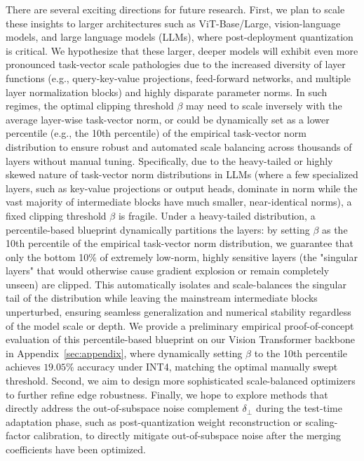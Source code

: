There are several exciting directions for future research. First, we plan to scale these insights to larger architectures such as ViT-Base/Large, vision-language models, and large language models (LLMs), where post-deployment quantization is critical. We hypothesize that these larger, deeper models will exhibit even more pronounced task-vector scale pathologies due to the increased diversity of layer functions (e.g., query-key-value projections, feed-forward networks, and multiple layer normalization blocks) and highly disparate parameter norms. In such regimes, the optimal clipping threshold $\beta$ may need to scale inversely with the average layer-wise task-vector norm, or could be dynamically set as a lower percentile (e.g., the 10th percentile) of the empirical task-vector norm distribution to ensure robust and automated scale balancing across thousands of layers without manual tuning. Specifically, due to the heavy-tailed or highly skewed nature of task-vector norm distributions in LLMs (where a few specialized layers, such as key-value projections or output heads, dominate in norm while the vast majority of intermediate blocks have much smaller, near-identical norms), a fixed clipping threshold $\beta$ is fragile. Under a heavy-tailed distribution, a percentile-based blueprint dynamically partitions the layers: by setting $\beta$ as the 10th percentile of the empirical task-vector norm distribution, we guarantee that only the bottom 10\% of extremely low-norm, highly sensitive layers (the "singular layers" that would otherwise cause gradient explosion or remain completely unseen) are clipped. This automatically isolates and scale-balances the singular tail of the distribution while leaving the mainstream intermediate blocks unperturbed, ensuring seamless generalization and numerical stability regardless of the model scale or depth. We provide a preliminary empirical proof-of-concept evaluation of this percentile-based blueprint on our Vision Transformer backbone in Appendix~\ref{sec:appendix}, where dynamically setting $\beta$ to the 10th percentile achieves $19.05\%$ accuracy under INT4, matching the optimal manually swept threshold. Second, we aim to design more sophisticated scale-balanced optimizers to further refine edge robustness. Finally, we hope to explore methods that directly address the out-of-subspace noise complement $\delta_{\perp}$ during the test-time adaptation phase, such as post-quantization weight reconstruction or scaling-factor calibration, to directly mitigate out-of-subspace noise after the merging coefficients have been optimized.
